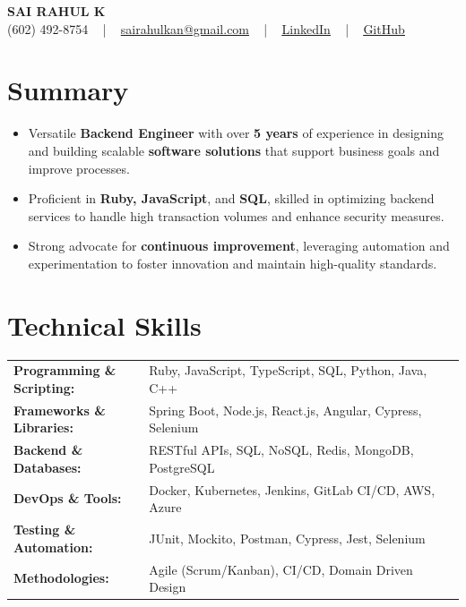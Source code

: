 \documentclass[letterpaper,11pt]{article}
\newcommand{\resumeItem}[1]{
  \item\footnotesize{
    {#1 \vspace{-2pt}}
  }
}
\newcommand{\resumeItemListStart}{\begin{itemize}[leftmargin=*]}
\newcommand{\resumeItemListEnd}{\end{itemize}\vspace{-5pt}}
\begin{document}
\begin{center}
    {\fontsize{14pt}{12pt}\selectfont \textbf{\MakeUppercase{Sai Rahul K}}}\\ \vspace{2pt}
    \fontsize{10pt}{12pt}\selectfont (602) 492-8754 ~ | ~ \href{mailto:sairahulkan@gmail.com}{sairahulkan@gmail.com} ~ | ~
    \href{https://www.linkedin.com/in/rq123/}{\color{blue}\underline{LinkedIn}} ~ | ~
    \href{https://github.com/kanrahuldo}{\color{blue}\underline{GitHub}}~
    \vspace{-8pt}
\end{center}

\section{Summary}
\fontsize{9pt}{10pt}\selectfont
\resumeItemListStart
    \resumeItem{Versatile \textbf{Backend Engineer} with over \textbf{5 years} of experience in designing and building scalable \textbf{software solutions} that support business goals and improve processes.} \vspace{-3pt}
    \resumeItem{Proficient in \textbf{Ruby, JavaScript}, and \textbf{SQL}, skilled in optimizing backend services to handle high transaction volumes and enhance security measures.} \vspace{-3pt}
    \resumeItem{Strong advocate for \textbf{continuous improvement}, leveraging automation and experimentation to foster innovation and maintain high-quality standards.} \vspace{-3pt}
\resumeItemListEnd
\vspace{-6pt}

\section{Technical Skills}
    \vspace{-14pt}
    \begin{table}[h]
        \fontsize{9pt}{10pt}\selectfont
        \begin{tabular}{p{0.3\linewidth} p{0.7\linewidth}}
            \textbf{Programming \& Scripting:} & Ruby, JavaScript, TypeScript, SQL, Python, Java, C++ \\
            \textbf{Frameworks \& Libraries:} & Spring Boot, Node.js, React.js, Angular, Cypress, Selenium \\
            \textbf{Backend \& Databases:} & RESTful APIs, SQL, NoSQL, Redis, MongoDB, PostgreSQL \\
            \textbf{DevOps \& Tools:} & Docker, Kubernetes, Jenkins, GitLab CI/CD, AWS, Azure \\
            \textbf{Testing \& Automation:} & JUnit, Mockito, Postman, Cypress, Jest, Selenium \\
            \textbf{Methodologies:} & Agile (Scrum/Kanban), CI/CD, Domain Driven Design \\
        \end{tabular}
    \end{table}
\vspace{-15pt}
\end{document}
